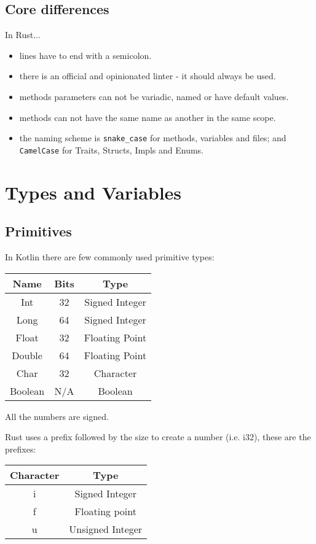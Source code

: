 \documentclass[a4paper,11pt]{article}
\begin{document}
\subsection{Core differences}
In Rust...
\begin{itemize}
	\item lines have to end with a semicolon.
  \item there is an official and opinionated linter - it should always be used.
  \item methods parameters can not be variadic, named or have default values.
  \item methods can not have the same name as another in the same scope.
  \item the naming scheme is \lstinline{snake_case} for methods, variables and files; and \lstinline{CamelCase} for Traits, Structs, Impls and Enums.
\end{itemize}

\newpage
\section{Types and Variables}
\subsection{Primitives}
In Kotlin there are few commonly used primitive types:

\renewcommand{\arraystretch}{1.3}

\begin{center}
\begin{tabular}{ c|c|c } 
 
 Name & Bits & Type \\ 
 \hline
 Int & 32 & Signed Integer \\ 
 Long & 64 & Signed Integer \\ 
 Float & 32 & Floating Point \\ 
 Double & 64 & Floating Point \\ 
 Char & 32 & Character \\ 
 Boolean & N/A & Boolean \\ 
 
\end{tabular}
\end{center}
All the numbers are signed. 

Rust uses a prefix followed by the size to create a number (i.e. i32), these are the prefixes:

\begin{center}
\begin{tabular}{ c|c } 

 Character & Type \\ 
 \hline
 i & Signed Integer \\ 
 f & Floating point \\ 
 u & Unsigned Integer \\ 
 
\end{tabular}
\end{center}
\end{document}
